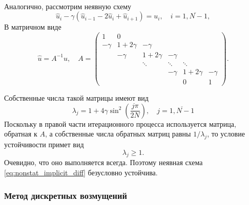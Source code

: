 \
\label{sec:NonstatImpDiff}

Аналогично, рассмотрим неявную схему
\begin{equation}
    \label{eq:nonstat_implicit_diff}
    \hat u_i - \gamma (\hat u_{i-1} - 2 \hat u_i + \hat u_{i+1}) = u_i, \quad i = \overline{1, N-1},
\end{equation}
В матричном виде
\begin{equation*}
    \hat u = A^{-1} u, \quad
    A = \left(
        \begin{array}{cccccc}
            1      & 0          &           &            &           &        \\
            -\gamma& 1+2\gamma  &-\gamma    &            &           &        \\
                   &-\gamma     & 1+2\gamma &-\gamma     &           &        \\
                   &            & \ddots    & \ddots     & \ddots    &        \\
                   &            &           &-\gamma     & 1+2\gamma &-\gamma \\ 
                   &            &           &            & 0         & 1      
        \end{array}
    \right).
\end{equation*}

Собственные числа такой матрицы имеют вид
\begin{equation*}
    \lambda_j = 1 + 4\gamma\sin^2\left(\frac{j\pi}{2 N}\right), \quad j = \overline{1, N-1}
\end{equation*}
Поскольку в правой части итерационного процесса используется матрица, обратная к $A$,
а собственные числа обратных матриц равны $1/\lambda_j$, то условие устойчивости
примет вид
\begin{equation*}
    \lambda_j \geq 1.
\end{equation*}
Очевидно, что оно выполняется всегда. Поэтому неявная схема \eqref{eq:nonstat_implicit_diff} безусловно устойчива.

\subsubsection{Метод дискретных возмущений}

